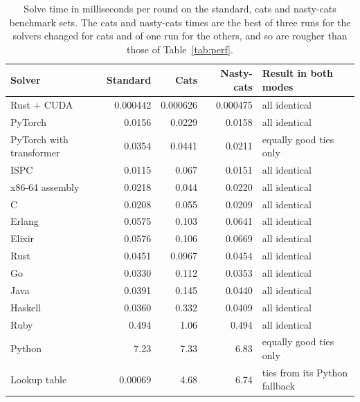 \documentclass[11pt,a4paper]{article}
\theoremstyle{definition}
\theoremstyle{remark}
\begin{document}
\begin{table}[ht]
\centering
\small
\begin{tabular}{@{}lrrrl@{}}
\toprule
Solver & Standard & Cats & Nasty-cats & Result in both modes \\ \midrule
Rust + CUDA & 0.000442 & 0.000626 & 0.000475 & all identical \\
PyTorch & 0.0156 & 0.0229 & 0.0158 & all identical \\
PyTorch with transformer & 0.0354 & 0.0441 & 0.0211 & equally good ties only \\
ISPC & 0.0115 & 0.067 & 0.0151 & all identical \\
x86-64 assembly & 0.0218 & 0.044 & 0.0220 & all identical \\
C & 0.0208 & 0.055 & 0.0209 & all identical \\
Erlang & 0.0575 & 0.103 & 0.0641 & all identical \\
Elixir & 0.0576 & 0.106 & 0.0669 & all identical \\
Rust & 0.0451 & 0.0967 & 0.0454 & all identical \\
Go & 0.0330 & 0.112 & 0.0353 & all identical \\
Java & 0.0391 & 0.145 & 0.0440 & all identical \\
Haskell & 0.0360 & 0.332 & 0.0409 & all identical \\
Ruby & 0.494 & 1.06 & 0.494 & all identical \\
Python & 7.23 & 7.33 & 6.83 & equally good ties only \\
Lookup table & 0.00069 & 4.68 & 6.74 & ties from its Python fallback \\ \bottomrule
\end{tabular}
\caption{Solve time in milliseconds per round on the standard, cats and nasty-cats benchmark sets. The
cats and nasty-cats times are the best of three runs for the solvers changed for cats and of one run for the others, and so are rougher than those of
Table~\ref{tab:perf}.}
\label{tab:catsbench}
\end{table}
\end{document}
